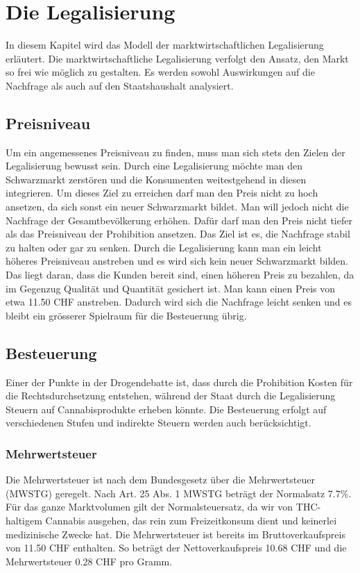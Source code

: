 \documentclass[../main.tex]{subfiles}
\begin{document}
	 \section{Die Legalisierung}
	 
	 In diesem Kapitel wird das Modell der marktwirtschaftlichen Legalisierung erläutert. 
	 Die marktwirtschaftliche Legalisierung verfolgt den Ansatz, den Markt so frei wie möglich zu gestalten. 
	 Es werden sowohl Auswirkungen auf die Nachfrage als auch auf den Staatshaushalt analysiert. 
	 
	 \subsection{Preisniveau}
	 
	 Um ein angemessenes Preisniveau zu finden, muss man sich stets den Zielen der Legalisierung bewusst sein. 
	 Durch eine Legalisierung möchte man den Schwarzmarkt zerstören und die Konsumenten weitestgehend in diesen integrieren. 
	 Um dieses Ziel zu erreichen darf man den Preis nicht zu hoch ansetzen, da sich sonst ein neuer Schwarzmarkt bildet. 
	 Man will jedoch nicht die Nachfrage der Gesamtbevölkerung erhöhen. 
	 Dafür darf man den Preis nicht tiefer als das Preisniveau der Prohibition ansetzen. 
	 Das Ziel ist es, die Nachfrage stabil zu halten oder gar zu senken.
	 Durch die Legalisierung kann man ein leicht höheres Preisniveau anstreben und es wird sich kein neuer Schwarzmarkt bilden. 
	 Das liegt daran, dass die Kunden bereit sind, einen höheren Preis zu bezahlen, da im Gegenzug Qualität und Quantität gesichert ist. 
	 Man kann einen Preis von etwa 11.50 CHF anstreben. 
	 Dadurch wird sich die Nachfrage leicht senken und es bleibt ein grösserer Spielraum für die Besteuerung übrig.
	  
	 
	 \subsection{Besteuerung}
	 
	 Einer der Punkte in der Drogendebatte ist, dass durch die Prohibition Kosten für die Rechtsdurchsetzung entstehen, während der Staat durch die Legalisierung Steuern auf Cannabisprodukte erheben könnte. 
	 Die Besteuerung erfolgt auf verschiedenen Stufen und indirekte Steuern werden auch berücksichtigt.
	 
	 \subsubsection{Mehrwertsteuer}
	 Die Mehrwertsteuer ist nach dem Bundesgesetz über die Mehrwertsteuer (MWSTG) geregelt.
	 Nach Art. 25 Abs. 1 MWSTG beträgt der Normalsatz 7.7\%. 
	 Für das ganze Marktvolumen gilt der Normalsteuersatz, da wir von THC-haltigem Cannabis ausgehen, das rein zum Freizeitkonsum dient und keinerlei medizinische Zwecke hat. 
	 Die Mehrwertsteuer ist bereits im Bruttoverkaufspreis von 11.50 CHF enthalten. 
	 So beträgt der Nettoverkaufspreis 10.68 CHF und die Mehrwertsteuer 0.28 CHF pro Gramm. \\
	 
\end{document}
